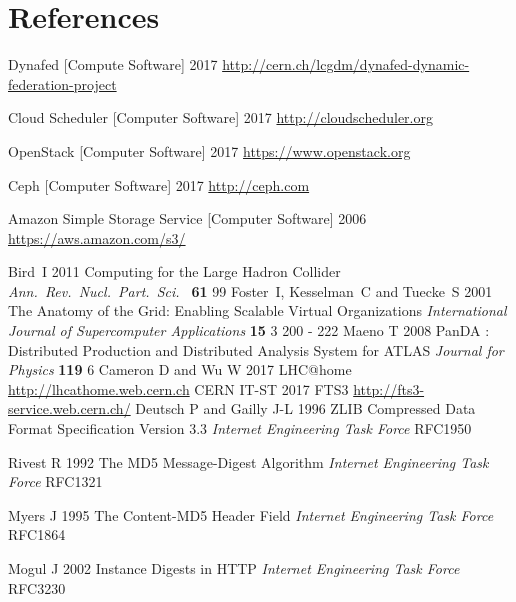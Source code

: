 \documentclass[a4paper]{jpconf}
\begin{document}
\section*{References}
\begin{thebibliography}{9}
  Dynafed [Compute Software]
  2017
  \url{http://cern.ch/lcgdm/dynafed-dynamic-federation-project}

  Cloud Scheduler [Computer Software]
  2017
  \url{http://cloudscheduler.org}

  OpenStack [Computer Software]
  2017
  \url{https://www.openstack.org}

  Ceph [Computer Software]
  2017
  \url{http://ceph.com}

  Amazon Simple Storage Service [Computer Software]
  2006
  \url{https://aws.amazon.com/s3/}

  Bird~I
  2011
  Computing for the Large Hadron Collider
  {\it Ann.\ Rev.\ Nucl.\ Part.\ Sci.\ } {\bf 61} 99
  Foster~I, Kesselman~C and Tuecke~S
  2001
  The Anatomy of the Grid: Enabling Scalable Virtual Organizations
  {\it International Journal of Supercomputer Applications} {\bf 15} 3 200 - 222
  Maeno T
  2008
  PanDA : Distributed Production and Distributed Analysis System for ATLAS
  {\it Journal for Physics} {\bf 119} 6
  Cameron D and Wu W
  2017
  LHC@home
  \url{http://lhcathome.web.cern.ch}
  CERN IT-ST
  2017
  FTS3
  \url{http://fts3-service.web.cern.ch/}
  Deutsch P and Gailly J-L
  1996
  ZLIB Compressed Data Format Specification Version 3.3
  {\it  Internet Engineering Task Force} RFC1950

  Rivest R
  1992
  The MD5 Message-Digest Algorithm
  {\it  Internet Engineering Task Force} RFC1321

  Myers J
  1995
  The Content-MD5 Header Field
  {\it  Internet Engineering Task Force} RFC1864

  Mogul J
  2002
  Instance Digests in HTTP
  {\it  Internet Engineering Task Force} RFC3230

\end{thebibliography}
\end{document}
